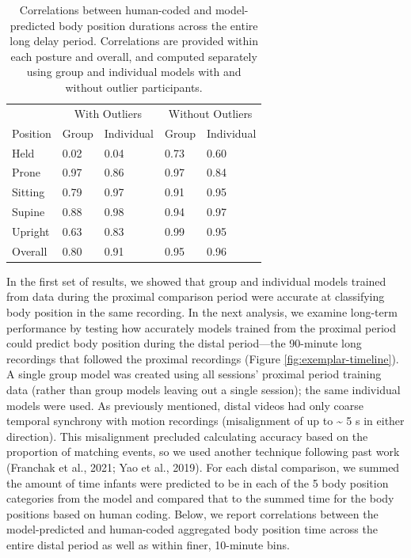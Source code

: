 \documentclass[
  man]{apa6}
\begin{document}
\begin{table}[tbp]

\begin{center}
\begin{threeparttable}

\caption{\label{tab:pt2overalltable}Correlations between human-coded and model-predicted body position durations across the entire long delay period. Correlations are provided within each posture and overall, and computed separately using group and individual models with and without outlier participants.}

\begin{tabular}{lllll}
\toprule
 & \multicolumn{2}{c}{With Outliers} & \multicolumn{2}{c}{Without Outliers} \\
\cmidrule(r){2-3} \cmidrule(r){4-5}
Position & Group & Individual & Group & Individual\\
\midrule
Held & 0.02 & 0.04 & 0.73 & 0.60\\
Prone & 0.97 & 0.86 & 0.97 & 0.84\\
Sitting & 0.79 & 0.97 & 0.91 & 0.95\\
Supine & 0.88 & 0.98 & 0.94 & 0.97\\
Upright & 0.63 & 0.83 & 0.99 & 0.95\\ \midrule
Overall & 0.80 & 0.91 & 0.95 & 0.96\\
\bottomrule
\end{tabular}

\end{threeparttable}
\end{center}

\end{table}

In the first set of results, we showed that group and individual models trained from data during the proximal comparison period were accurate at classifying body position in the same recording. In the next analysis, we examine long-term performance by testing how accurately models trained from the proximal period could predict body position during the distal period---the 90-minute long recordings that followed the proximal recordings (Figure \ref{fig:exemplar-timeline}). A single group model was created using all sessions' proximal period training data (rather than group models leaving out a single session); the same individual models were used. As previously mentioned, distal videos had only coarse temporal synchrony with motion recordings (misalignment of up to \textasciitilde{} 5 s in either direction). This misalignment precluded calculating accuracy based on the proportion of matching events, so we used another technique following past work (Franchak et al., 2021; Yao et al., 2019). For each distal comparison, we summed the amount of time infants were predicted to be in each of the 5 body position categories from the model and compared that to the summed time for the body positions based on human coding. Below, we report correlations between the model-predicted and human-coded aggregated body position time across the entire distal period as well as within finer, 10-minute bins.
\end{document}

